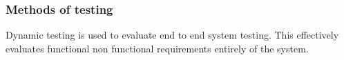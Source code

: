 \documentclass[12pt]{article}
\begin{document}

\subsubsection{Methods of testing}
Dynamic testing is used to evaluate end to end system testing. This effectively evaluates functional non functional requirements entirely of the system. 
\end{document}
